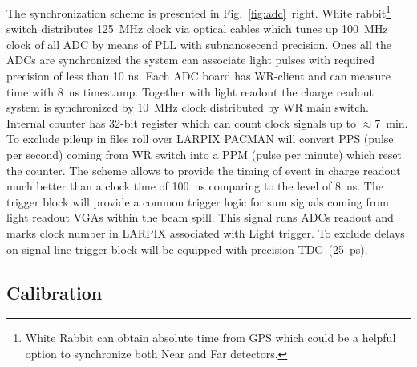 The synchronization scheme is presented in Fig.~\ref{fig:adc}~right. White rabbit\footnote{White Rabbit can obtain absolute time from GPS which could be a helpful option to synchronize both Near and Far detectors.} switch distributes 125~MHz clock via optical cables which tunes up 100~MHz clock of all ADC by means of PLL with subnanosecend precision. Ones all the ADCs are synchronized the system can associate light pulses with required precision of less than 10 ns. 
Each ADC board has WR-client and can measure time with 8~ns timestamp. Together with light readout the charge readout system is synchronized by 10~MHz clock distributed by WR main switch. Internal counter has 32-bit register which can count clock signals up to $\approx7$~min.  To exclude pileup in files roll over LARPIX PACMAN will convert PPS (pulse per second) coming from WR switch into a PPM (pulse per minute) which reset the counter. 
The scheme allows to provide the timing of event in charge readout much better than a clock time of 100~ns comparing to the level of 8~ns.
The trigger block will provide a common trigger logic for sum signals coming from light readout VGAs within the beam spill. This signal runs ADCs readout and marks clock number in LARPIX associated with Light trigger. To exclude delays on signal line trigger block will be equipped with precision TDC~(25~ps).




\subsection{Calibration}
\label{sec:lartpc-des-calib}

